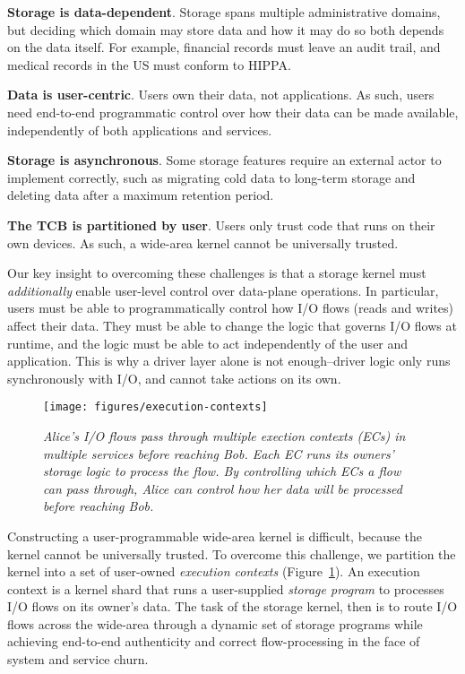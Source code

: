 \textbf{Storage is data-dependent}. Storage spans multiple
administrative domains, but deciding which domain may store data and how it may
do so both depends on the data itself. For example, financial records must leave
an audit trail, and medical records in the US must conform to HIPPA.

\textbf{Data is user-centric}. Users own their data, not applications.
As such, users need end-to-end programmatic control over how their data
can be made available, independently of both applications and services.

\textbf{Storage is asynchronous}. Some storage features require an external
actor to implement correctly, such as migrating cold data to long-term storage
and deleting data after a maximum retention period.

\textbf{The TCB is partitioned by user}.  Users only trust code that runs on their own
devices.  As such, a wide-area kernel cannot be universally trusted.

Our key insight to overcoming these challenges is that a storage kernel
must \textit{additionally} enable user-level control over data-plane operations.
In particular, users must be able to programmatically
control how I/O flows (reads and writes) affect their data.  They must be able to change the
logic that governs I/O flows at runtime, and the logic must be able to
act independently of the user and application.  This is why a driver layer alone is
not enough--driver logic only runs synchronously with I/O, and cannot take
actions on its own.

\begin{figure}[t!]
\centering
\texttt{[image: figures/execution-contexts]}
\caption{\it Alice's I/O flows pass through
   multiple exection contexts (ECs) in multiple services before reaching Bob.  Each
   EC runs its owners' storage logic to process the flow.  By
   controlling which ECs a flow can pass through, Alice can control how her data
   will be processed before reaching Bob.}
\label{fig:execution-contexts}
\end{figure}

Constructing a user-programmable wide-area kernel is difficult, because the kernel cannot be
universally trusted.  To overcome this challenge, we partition the kernel into a
set of user-owned \textit{execution contexts}
(Figure~\ref{fig:execution-contexts}).  An execution context is a
kernel shard that runs a user-supplied \textit{storage program} to processes I/O
flows on its owner's data.  The task of the storage kernel, then is to 
route I/O flows across the wide-area 
through a dynamic set of storage programs
while achieving end-to-end authenticity and correct flow-processing in the face
of system and service churn.


